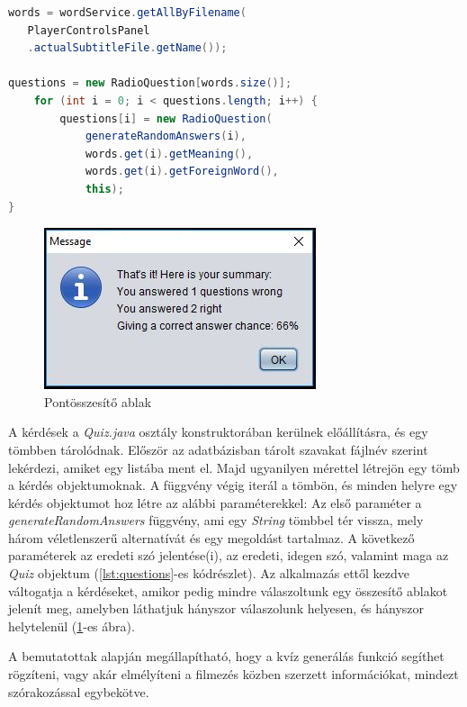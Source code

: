 \begin{spacing}{1.25}
\begin{lstlisting}[caption=Kérdések előállítása, language=java, label={lst:questions}]
words = wordService.getAllByFilename(
   PlayerControlsPanel
   .actualSubtitleFile.getName());

questions = new RadioQuestion[words.size()];
    for (int i = 0; i < questions.length; i++) {
        questions[i] = new RadioQuestion(
            generateRandomAnswers(i),
            words.get(i).getMeaning(),
            words.get(i).getForeignWord(),
            this);
}
\end{lstlisting}
\end{spacing}

  \begin{figure}[h!]
\centering
  \includegraphics[width=.5\linewidth]{images/summary.jpg}
  \caption{Pontösszesítő ablak}
  \label{fig:summary}
\end{figure}

 A kérdések a \textit{Quiz.java} osztály konstruktorában kerülnek előállításra, és egy tömbben tárolódnak. Először az adatbázisban tárolt szavakat fájlnév szerint lekérdezi, amiket egy listába ment el. Majd ugyanilyen mérettel létrejön egy tömb a kérdés objektumoknak. A függvény végig iterál a tömbön, és minden helyre egy kérdés objektumot hoz létre az alábbi paraméterekkel: Az első paraméter a \textit{generateRandomAnswers} függvény, ami egy \textit{String} tömbbel tér vissza, mely három véletlenszerű alternatívát és egy megoldást tartalmaz. A következő paraméterek az eredeti szó jelentése(i), az eredeti, idegen szó, valamint maga az \textit{Quiz} objektum (\ref{lst:questions}-es kódrészlet). Az alkalmazás ettől kezdve váltogatja a kérdéseket, amikor pedig mindre válaszoltunk egy összesítő ablakot jelenít meg, amelyben láthatjuk hányszor válaszolunk helyesen, és hányszor helytelenül (\ref{fig:summary}-es ábra).
 

A bemutatottak alapján megállapítható, hogy a kvíz generálás funkció segíthet rögzíteni, vagy akár elmélyíteni a filmezés közben szerzett információkat, mindezt szórakozással egybekötve.
